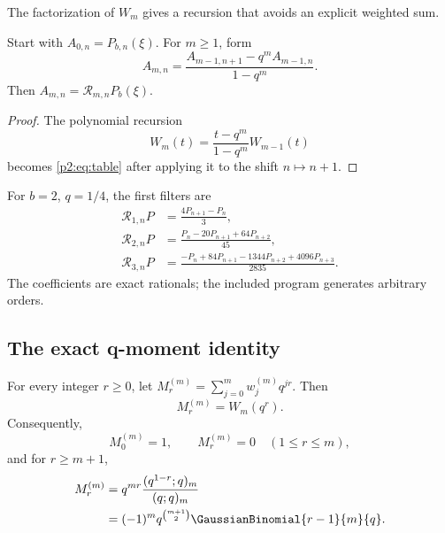 \documentclass[11pt,oneside]{article}
\numberwithin{equation}{section}
\theoremstyle{definition}
\theoremstyle{remark}
\begin{document}
The factorization of \(W_m\) gives a recursion that avoids an explicit weighted
sum.

\begin{algorithm}
\label{p2:alg:table}
Start with \(A_{0,n}=P_{b,n}(\xi)\). For \(m\geq1\), form
\begin{equation}
 A_{m,n}=\frac{A_{m-1,n+1}-q^mA_{m-1,n}}{1-q^m}.
 \label{p2:eq:table}
\end{equation}
Then \(A_{m,n}=\mathcal R_{m,n}P_b(\xi)\).
\end{algorithm}

\begin{proof}
The polynomial recursion
\[
 W_m(t)=\frac{t-q^m}{1-q^m}W_{m-1}(t)
\]
becomes \eqref{p2:eq:table} after applying it to the shift \(n\mapsto n+1\).
\end{proof}

For \(b=2\), \(q=1/4\), the first filters are
\begin{align}
 \mathcal R_{1,n}P&=\frac{4P_{n+1}-P_n}{3},
 \label{p2:eq:m1}\\
 \mathcal R_{2,n}P&=\frac{P_n-20P_{n+1}+64P_{n+2}}{45},
 \label{p2:eq:m2}\\
 \mathcal R_{3,n}P&=\frac{-P_n+84P_{n+1}-1344P_{n+2}+4096P_{n+3}}{2835}.
 \label{p2:eq:m3}
\end{align}
The coefficients are exact rationals; the included program generates arbitrary
orders.

\subsection{The exact q-moment identity}

\begin{lemma}
\label{p2:lem:qmoments}
For every integer \(r\geq0\), let
\(M_r^{(m)}=\sum_{j=0}^m w_j^{(m)}q^{jr}\). Then
\begin{equation}
 M_r^{(m)}=W_m(q^r).
 \label{p2:eq:MrW}
\end{equation}
Consequently,
\begin{equation}
 M_0^{(m)}=1,
 \qquad M_r^{(m)}=0\quad(1\leq r\leq m),
 \label{p2:eq:cancelmom}
\end{equation}
and for \(r\geq m+1\),
\begin{align}
 M_r^{(m)}
 &=q^{mr}\frac{(q^{1-r};q)_m}{(q;q)_m}
 \label{p2:eq:Mrpoch}\\
 &=(-1)^m q^{\binom{m+1}{2}}\GaussianBinomial{r-1}{m}{q}.
 \label{p2:eq:Mrqbinom}
\end{align}
\end{lemma}
\end{document}
